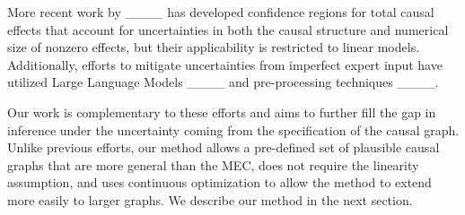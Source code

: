 More recent work by ____ has developed confidence regions for total causal effects that account for uncertainties in both the causal structure and numerical size of nonzero effects, but their applicability is restricted to linear models.
Additionally, efforts to mitigate uncertainties from imperfect expert input have utilized Large Language Models ____ and pre-processing techniques ____.

Our work is complementary to these efforts and aims to further fill the gap in inference under the uncertainty coming from the specification of the causal graph. Unlike previous efforts, our method allows a pre-defined set of plausible causal graphs that are more general than the MEC, does not require the linearity assumption, and uses continuous optimization to allow the method to extend more easily to larger graphs. We describe our method in the next section.

%
%
%